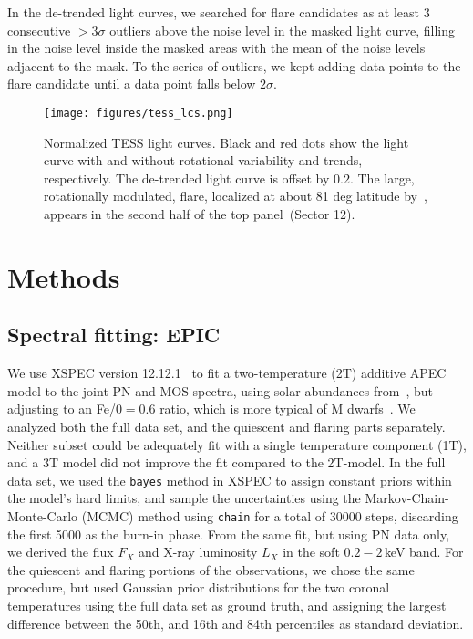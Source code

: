 \documentclass[twocolumn]{aastex631}
\begin{document}
In the de-trended light curves, we searched for flare candidates as at least 3 consecutive $>3\sigma$ outliers above the noise level in the masked light curve, filling in the noise level inside the masked areas with the mean of the noise levels adjacent to the mask. To the series of outliers, we kept adding data points to the flare candidate until a data point falls below $2\sigma$. 

\begin{figure*}
    \begin{centering}
        \texttt{[image: figures/tess\_lcs.png]}
        \caption{
         Normalized TESS light curves. Black and red dots show the light curve with and without rotational variability and trends, respectively. The de-trended light curve is offset by $0.2$. The large, rotationally modulated, flare, localized at about 81 deg latitude by~\citet{ilin2021giant}, appears in the second half of the top panel~(Sector 12).}
        \label{fig:tess_lcs}
    \end{centering}
\end{figure*}


\section{Methods}
\label{sec:methods}


\subsection{Spectral fitting: EPIC}
\label{sec:methods:epic}
We use XSPEC version 12.12.1~\citep{arnaud1996xspec} to fit a two-temperature (2T) additive APEC~\citep{smith2001collisional,foster2012updated} model to the joint PN and MOS spectra, using solar abundances from~\citet{grevesse1998standard}, but adjusting to an Fe/0$=0.6$ ratio, which is more typical of M dwarfs~\citep{wood2018chandra}. We analyzed both the full data set, and the quiescent and flaring parts separately. Neither subset could be adequately fit with a single temperature component (1T), and a 3T model did not improve the fit compared to the 2T-model. In the full data set, we used the \texttt{bayes} method in XSPEC to assign constant priors within the model's hard limits, and sample the uncertainties using the Markov-Chain-Monte-Carlo (MCMC) method using \texttt{chain} for a total of 30000 steps, discarding the first 5000 as the burn-in phase. From the same fit, but using PN data only, we derived the flux $F_X$ and X-ray luminosity $L_X$ in the soft $0.2-2\,$keV band. For the quiescent and flaring portions of the observations, we chose the same procedure, but used Gaussian prior distributions for the two coronal temperatures using the full data set as ground truth, and assigning the largest difference between the 50th, and 16th and 84th percentiles as standard deviation.
\end{document}

